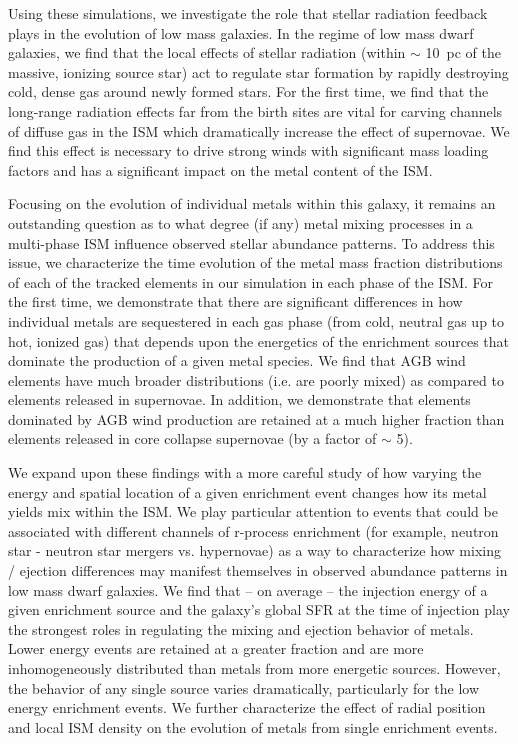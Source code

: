 Using these simulations, we investigate the role that stellar radiation feedback plays in the evolution of low mass galaxies.
In the regime of low mass dwarf galaxies, we find that the local effects of stellar radiation (within $\sim$ 10~pc of the massive, ionizing source star) act to regulate star formation by rapidly destroying cold, dense gas around newly formed stars. For the first time, we find that the long-range radiation effects far from the birth sites are vital for carving channels of diffuse gas in the ISM which dramatically increase the effect of supernovae. We find this effect is necessary to drive strong winds with significant mass loading factors and has a significant impact on the metal content of the ISM.

Focusing on the evolution of individual metals within this galaxy, it remains an outstanding question as to what degree (if any) metal mixing processes in a multi-phase ISM influence observed stellar abundance patterns. To address this issue, we characterize the time evolution of the metal mass fraction distributions of each of the tracked elements in our simulation in each phase of the ISM. For the first time, we demonstrate that there are significant differences in how individual metals are sequestered in each gas phase (from cold, neutral gas up to hot, ionized gas) that depends upon the energetics of the enrichment sources that dominate the production of a given metal species. We find that AGB wind elements have much broader distributions (i.e. are poorly mixed) as compared to elements released in supernovae. In addition, we demonstrate that elements dominated by AGB wind production are retained at a much higher fraction than elements released in core collapse supernovae (by a factor of $\sim$ 5).

We expand upon these findings with a more careful study of how varying the energy and spatial location of a given enrichment event changes how its metal yields mix within the ISM. We play particular attention to events that could be associated with different channels of r-process enrichment (for example, neutron star - neutron star mergers vs. hypernovae) as a way to characterize how mixing / ejection differences may manifest themselves in observed abundance patterns in low mass dwarf galaxies. We find that -- on average -- the injection energy of a given enrichment source and the galaxy's global SFR at the time of injection play the strongest roles in regulating the mixing and ejection behavior of metals. Lower energy events are retained at a greater fraction and are more inhomogeneously distributed than metals from more energetic sources. However, the behavior of any single source varies dramatically, particularly for the low energy enrichment events. We further characterize the
effect of radial position and local ISM density on the evolution of metals from single enrichment events.

